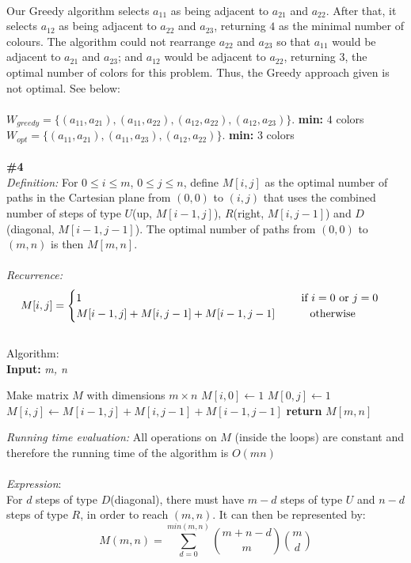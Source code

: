 \documentclass{article}
\newcommand\tab[1][1cm]{\hspace*{#1}}
\begin{document}
\\
Our Greedy algorithm selects $a_{11}$ as being adjacent to $a_{21}$ and $a_{22}$. After that, it selects $a_{12}$ as being adjacent to $a_{22}$ and $a_{23}$, returning $4$ as the minimal number of colours. The algorithm could not rearrange $a_{22}$ and $a_{23}$ so that $a_{11}$ would be adjacent to $a_{21}$ and $a_{23}$; and $a_{12}$ would be adjacent to $a_{22}$, returning $3$, the optimal number of colors for this problem. Thus, the Greedy approach given is not optimal. See below:\\
\\
$W_{greedy} = \{(a_{11}, a_{21}), (a_{11}, a_{22}), (a_{12}, a_{22}), (a_{12}, a_{23})\}$. \textbf{min:} $4$ colors\\
$W_{opt} = \{(a_{11}, a_{21}), (a_{11}, a_{23}), (a_{12}, a_{22})\}$. \textbf{min:} 3 colors\\
\\
\textbf{\#4}\\
\textit{Definition:} For $0 \leq i \leq m$, $0 \leq j \leq n$, define $M[i, j]$ as the optimal number of paths in the Cartesian plane from $(0, 0)$ to $(i, j)$ that uses the combined number of steps of type $U$(up, $M[i-1, j]$), $R$(right, $M[i, j-1]$) and $D$(diagonal, $M[i-1, j-1]$). The optimal number of paths from $(0,0)$ to $(m, n)$ is then $M[m, n]$.\\
\\
\textit{Recurrence:}
\begin{gather*}
M[i, j] =
\begin{cases}
1 \tab\tab\tab\tab\tab\tab\tab $if $i = 0$ or $j = 0 \\
M[i-1, j] + M[i, j-1] + M[i-1, j-1] \tab $ otherwise $
\end{cases}
\end{gather*}\\
Algorithm:\\
\textbf{Input:} \textit{m, n}
\begin{algorithmic}
\State Make matrix $M$ with dimensions $m \times n$
  \State $M[i, 0] \gets 1$
\EndFor
{}
  \State $M[0, j] \gets 1$
\EndFor
{}
    \State $M[i, j] \gets M[i-1, j] + M[i, j-1] + M[i-1, j-1]$
  \EndFor
\EndFor
\State \textbf{return} $M[m, n]$\\
\end{algorithmic}
\textit{Running time evaluation:} All operations on $M$ (inside the loops) are constant and therefore the running time of the algorithm is $O(mn)$\\\\
\textit{Expression}:\\
For $d$ steps of type $D$(diagonal), there must have $m - d$ steps of type $U$ and $n - d$ steps of type $R$, in order to reach $(m, n)$. It can then be represented by:\\
$$M(m, n) = \sum_{d=0}^{min(m, n)} {m + n - d \choose m} {m \choose d} $$
\end{document}

